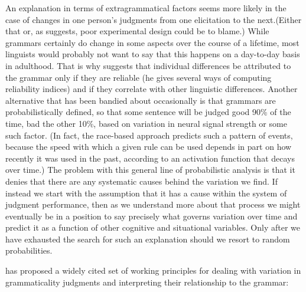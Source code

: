  An explanation in terms of extragrammatical factors seems more likely in the case of changes in one person's judgments from one elicitation to the next.\linebreak (Either that or, as \citet{Snow1975} suggests, poor experimental design could be to blame.) While grammars certainly do change in some aspects over the course of a lifetime, most linguists would probably not want to say that this happens on a day-to-day basis in adulthood. That is why \citet{Carden1973} suggests that individual differences be attributed to the grammar only if they are reliable (he gives several ways of computing reliability indices) and if they correlate with other linguistic differences. Another alternative that has been bandied about occasionally is that grammars are probabilistically defined, so that some  sentence  will  be judged good 90\% of the time, bad the other 10\%, based on variation in neural signal strength or some such factor. (In fact, the race-based approach predicts such a pattern of events, because the speed with which a given rule can be used depends in part on how recently it was used in the past, according to an activation function that decays over time.) The problem with this general line of probabilistic  analysis is that it denies that there are any systematic causes behind the variation we find. If instead we start with the assumption that it has a cause within the system of judgment performance, then as we understand more about that process we might  eventually  be in a position  to say precisely  what  governs  variation  over
 time and predict it as a function of other cognitive and situational variables. Only after we have exhausted the search for such an explanation should we resort to random  probabilities.

 \citet{Labov1975} has proposed a widely cited set of working principles for dealing with variation in grammaticality judgments and interpreting their relationship to the grammar:

